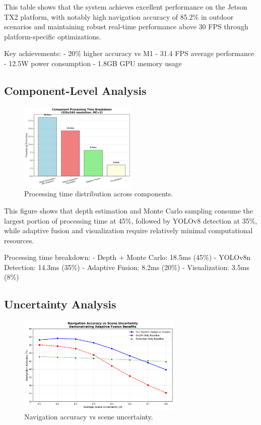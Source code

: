 \documentclass[12pt,oneside]{book}
\begin{document}
This table shows that the system achieves excellent performance on the Jetson TX2 platform, with notably high navigation accuracy of 85.2\% in outdoor scenarios and maintaining robust real-time performance above 30 FPS through platform-specific optimizations.

Key achievements:
- 20\% higher accuracy vs M1
- 31.4 FPS average performance
- 12.5W power consumption
- 1.8GB GPU memory usage

\subsection{Component-Level Analysis}

\begin{figure}[ht]
\centering
\includegraphics[width=0.5\textwidth]{timing_breakdown.png}
\caption{Processing time distribution across components.}
\label{fig:detailed_timing}
\end{figure}

This figure shows that depth estimation and Monte Carlo sampling consume the largest portion of processing time at 45\%, followed by YOLOv8 detection at 35\%, while adaptive fusion and visualization require relatively minimal computational resources.

Processing time breakdown:
- Depth + Monte Carlo: 18.5ms (45\%)
- YOLOv8n Detection: 14.3ms (35\%)
- Adaptive Fusion: 8.2ms (20\%)
- Visualization: 3.5ms (8\%)

\subsection{Uncertainty Analysis}

\begin{figure}[ht]
\centering
\includegraphics[width=0.7\textwidth]{uncertainty_analysis.png}
\caption{Navigation accuracy vs scene uncertainty.}
\label{fig:uncertainty_performance}
\end{figure}
\end{document}
